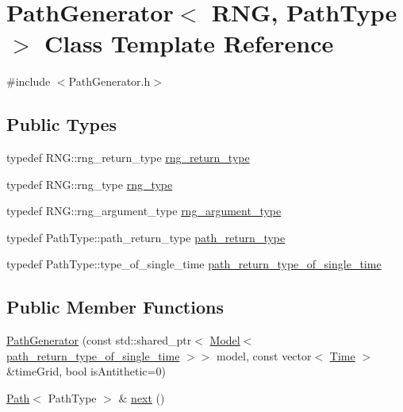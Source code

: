 \hypertarget{class_path_generator}{}\section{Path\+Generator$<$ R\+NG, Path\+Type $>$ Class Template Reference}
\label{class_path_generator}


{\ttfamily \#include $<$Path\+Generator.\+h$>$}

\subsection*{Public Types}
\begin{DoxyCompactItemize}
\item 
typedef R\+N\+G\+::rng\+\_\+return\+\_\+type \hyperlink{class_path_generator_aa97ab7e55299daa0f38539816f171369}{rng\+\_\+return\+\_\+type}
\item 
typedef R\+N\+G\+::rng\+\_\+type \hyperlink{class_path_generator_a7e71cbb5376b07b319b1f042a1035335}{rng\+\_\+type}
\item 
typedef R\+N\+G\+::rng\+\_\+argument\+\_\+type \hyperlink{class_path_generator_a2f6a701b324534da9f05ccc11c320e6b}{rng\+\_\+argument\+\_\+type}
\item 
typedef Path\+Type\+::path\+\_\+return\+\_\+type \hyperlink{class_path_generator_a7c8e36c418bdb1d8e99c44ac75a5e02a}{path\+\_\+return\+\_\+type}
\item 
typedef Path\+Type\+::type\+\_\+of\+\_\+single\+\_\+time \hyperlink{class_path_generator_a467bc3ddaa5e9104170550617e767349}{path\+\_\+return\+\_\+type\+\_\+of\+\_\+single\+\_\+time}
\end{DoxyCompactItemize}
\subsection*{Public Member Functions}
\begin{DoxyCompactItemize}
\item 
\hyperlink{class_path_generator_af6c5d75655e077378f702248f84e2920}{Path\+Generator} (const std\+::shared\+\_\+ptr$<$ \hyperlink{class_model}{Model}$<$ \hyperlink{class_path_generator_a467bc3ddaa5e9104170550617e767349}{path\+\_\+return\+\_\+type\+\_\+of\+\_\+single\+\_\+time} $>$$>$ model, const vector$<$ \hyperlink{_name_def_8h_ac2d3e0ba793497bcca555c7c2cf64ff3}{Time} $>$ \&time\+Grid, bool is\+Antithetic=0)
\item 
\hyperlink{class_path}{Path}$<$ Path\+Type $>$ \& \hyperlink{class_path_generator_aa90d7cd4206c42ac84b1ad7ee8660950}{next} ()
\end{DoxyCompactItemize}
